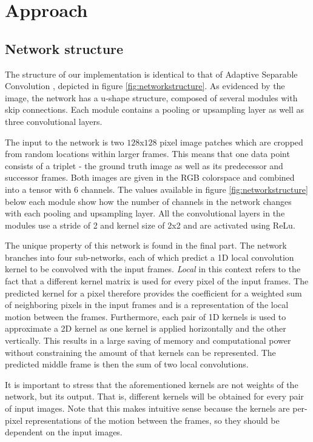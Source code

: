 \documentclass[10pt,twocolumn,letterpaper]{article}
\begin{document}
\section{Approach}
\label{sec:approach}


\subsection{Network structure}
The structure of our implementation is identical to that of Adaptive Separable Convolution \cite{SepConv}, depicted in figure \ref{fig:networkstructure}. As evidenced by the image, the network has a u-shape structure, composed of several modules with skip connections. Each module contains a pooling or upsampling layer as well as three convolutional layers.

The input to the network is two $128$x$128$ pixel image patches which are cropped from random locations within larger frames. This means that one data point consists of a triplet - the ground truth image as well as its predecessor and successor frames. Both images are given in the RGB colorspace and combined into a tensor with 6 channels. The values available in figure \ref{fig:networkstructure} below each module show how the number of channels in the network changes with each pooling and upsampling layer. All the convolutional layers in the modules use a stride of 2 and kernel size of 2x2 and are activated using ReLu.

The unique property of this network is found in the final part. The network branches into four sub-networks, each of which predict a 1D local convolution kernel to be convolved with the input frames. \textit{Local} in this context refers to the fact that a different kernel matrix is used for every pixel of the input frames. The predicted kernel for a pixel therefore provides the coefficient for a weighted sum of neighboring pixels in the input frames and is a representation of the local motion between the frames. Furthermore, each pair of 1D kernels is used to approximate a 2D kernel as one kernel is applied horizontally and the other vertically. This results in a large saving of memory and computational power without constraining the amount of that kernels can be represented. The predicted middle frame is then the sum of two local convolutions.

It is important to stress that the aforementioned kernels are not weights of the network, but its output. That is, different kernels will be obtained for every pair of input images. Note that this makes intuitive sense because the kernels are per-pixel representations of the motion between the frames, so they should be dependent on the input images.
\end{document}
